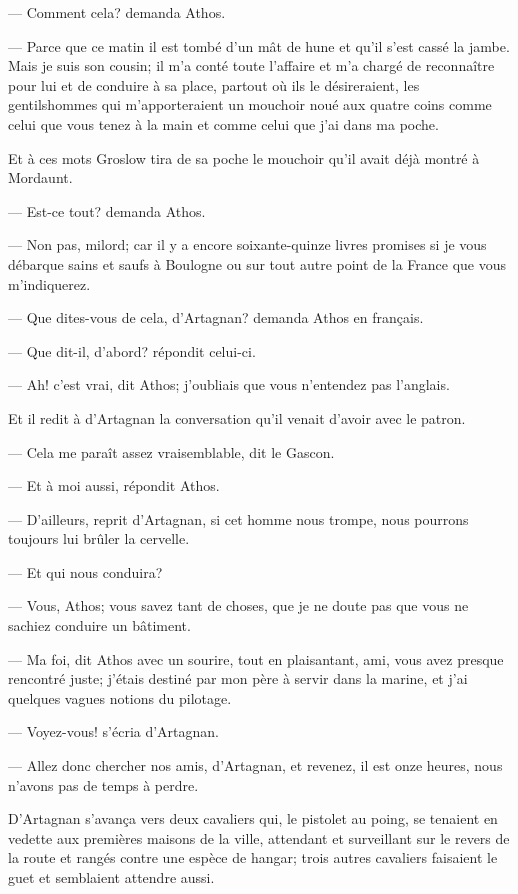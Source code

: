 — Comment cela? demanda Athos.

— Parce que ce matin il est tombé d'un mât de hune et qu'il s'est cassé la jambe. Mais je suis son cousin; il m'a conté toute l'affaire et m'a chargé de reconnaître pour lui et de conduire à sa place, partout où ils le désireraient, les gentilshommes qui m'apporteraient un mouchoir noué aux quatre coins comme celui que vous tenez à la main et comme celui que j'ai dans ma poche.

Et à ces mots Groslow tira de sa poche le mouchoir qu'il avait déjà montré à Mordaunt.

— Est-ce tout? demanda Athos.

— Non pas, milord; car il y a encore soixante-quinze livres promises si je vous débarque sains et saufs à Boulogne ou sur tout autre point de la France que vous m'indiquerez.

— Que dites-vous de cela, d'Artagnan? demanda Athos en français.

— Que dit-il, d'abord? répondit celui-ci.

— Ah! c'est vrai, dit Athos; j'oubliais que vous n'entendez pas l'anglais.

Et il redit à d'Artagnan la conversation qu'il venait d'avoir avec le patron.

— Cela me paraît assez vraisemblable, dit le Gascon.

— Et à moi aussi, répondit Athos.

— D'ailleurs, reprit d'Artagnan, si cet homme nous trompe, nous pourrons toujours lui brûler la cervelle.

— Et qui nous conduira?

— Vous, Athos; vous savez tant de choses, que je ne doute pas que vous ne sachiez conduire un bâtiment.

— Ma foi, dit Athos avec un sourire, tout en plaisantant, ami, vous avez presque rencontré juste; j'étais destiné par mon père à servir dans la marine, et j'ai quelques vagues notions du pilotage.

— Voyez-vous! s'écria d'Artagnan.

— Allez donc chercher nos amis, d'Artagnan, et revenez, il est onze heures, nous n'avons pas de temps à perdre.

D'Artagnan s'avança vers deux cavaliers qui, le pistolet au poing, se tenaient en vedette aux premières maisons de la ville, attendant et surveillant sur le revers de la route et rangés contre une espèce de hangar; trois autres cavaliers faisaient le guet et semblaient attendre aussi.

